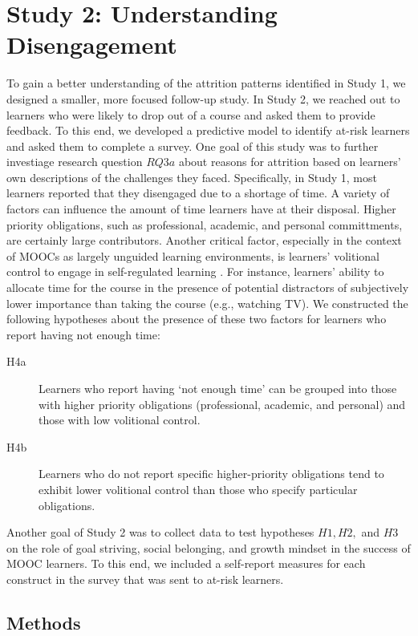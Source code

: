 \documentclass{sigchi}\usepackage[]{graphicx}\usepackage[]{color}
\begin{document}
\section{Study 2: Understanding Disengagement}

To gain a better understanding of the attrition patterns identified in Study 1, we designed a smaller, more focused follow-up study. In Study 2, we reached out to learners who were likely to drop out of a course and asked them to provide feedback. To this end, we developed a predictive model to identify at-risk learners and asked them to complete a survey. One goal of this study was to further investiage research question $RQ3a$ about reasons for attrition based on learners' own descriptions of the challenges they faced. Specifically, in Study 1, most learners reported that they disengaged due to a shortage of time. A variety of factors can influence the amount of time learners have at their disposal. Higher priority obligations, such as professional, academic, and personal committments, are certainly large contributors. Another critical factor, especially in the context of MOOCs as largely unguided learning environments, is learners' volitional control to engage in self-regulated learning \cite{corno2001volitional}. For instance, learners' ability to allocate time for the course in the presence of potential distractors of subjectively lower importance than taking the course (e.g., watching TV). We constructed the following hypotheses about the presence of these two factors for learners who report having not enough time:

\begin{description}
  \item[H4a] Learners who report having `not enough time' can be grouped into those with higher priority obligations (professional, academic, and personal) and those with low volitional control.
  \item[H4b] Learners who do not report specific higher-priority obligations tend to exhibit lower volitional control than those who specify particular obligations.
\end{description}  

Another goal of Study 2 was to collect data to test hypotheses $H1, H2,$ and $H3$ on the role of goal striving, social belonging, and growth mindset in the success of MOOC learners. To this end, we included a self-report measures for each construct in the survey that was sent to at-risk learners.

\subsection{Methods}
\end{document}
